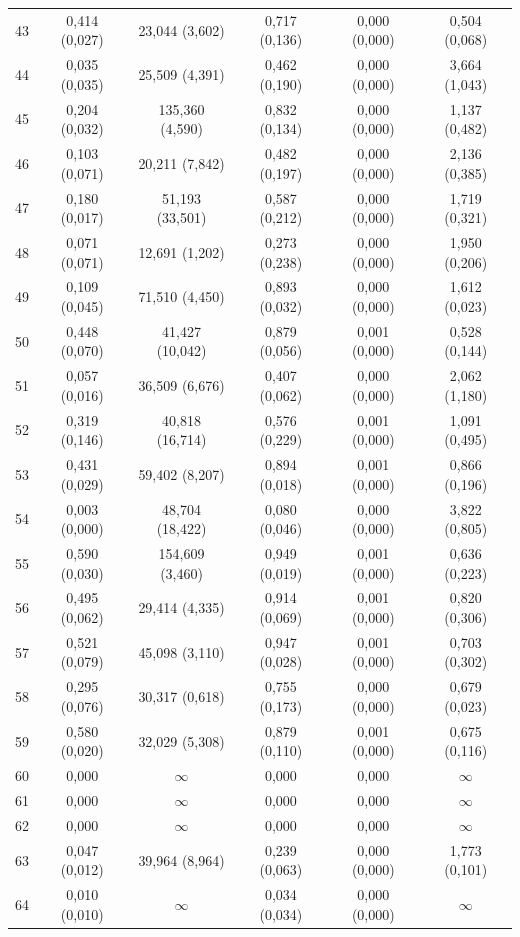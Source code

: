 \begin{tabular}{l c c c c c}
43 & 0,414 (0,027) & 23,044 (3,602) & 0,717 (0,136) & 0,000 (0,000) & 0,504 (0,068) \\
44 & 0,035 (0,035) & 25,509 (4,391) & 0,462 (0,190) & 0,000 (0,000) & 3,664 (1,043) \\
45 & 0,204 (0,032) & 135,360 (4,590) & 0,832 (0,134) & 0,000 (0,000) & 1,137 (0,482) \\
46 & 0,103 (0,071) & 20,211 (7,842) & 0,482 (0,197) & 0,000 (0,000) & 2,136 (0,385) \\
47 & 0,180 (0,017) & 51,193 (33,501) & 0,587 (0,212) & 0,000 (0,000) & 1,719 (0,321) \\
48 & 0,071 (0,071) & 12,691 (1,202) & 0,273 (0,238) & 0,000 (0,000) & 1,950 (0,206) \\
49 & 0,109 (0,045) & 71,510 (4,450) & 0,893 (0,032) & 0,000 (0,000) & 1,612 (0,023) \\
50 & 0,448 (0,070) & 41,427 (10,042) & 0,879 (0,056) & 0,001 (0,000) & 0,528 (0,144) \\
51 & 0,057 (0,016) & 36,509 (6,676) & 0,407 (0,062) & 0,000 (0,000) & 2,062 (1,180) \\
52 & 0,319 (0,146) & 40,818 (16,714) & 0,576 (0,229) & 0,001 (0,000) & 1,091 (0,495) \\
53 & 0,431 (0,029) & 59,402 (8,207) & 0,894 (0,018) & 0,001 (0,000) & 0,866 (0,196) \\
54 & 0,003 (0,000) & 48,704 (18,422) & 0,080 (0,046) & 0,000 (0,000) & 3,822 (0,805) \\
55 & 0,590 (0,030) & 154,609 (3,460) & 0,949 (0,019) & 0,001 (0,000) & 0,636 (0,223) \\
56 & 0,495 (0,062) & 29,414 (4,335) & 0,914 (0,069) & 0,001 (0,000) & 0,820 (0,306) \\
57 & 0,521 (0,079) & 45,098 (3,110) & 0,947 (0,028) & 0,001 (0,000) & 0,703 (0,302) \\
58 & 0,295 (0,076) & 30,317 (0,618) & 0,755 (0,173) & 0,000 (0,000) & 0,679 (0,023) \\
59 & 0,580 (0,020) & 32,029 (5,308) & 0,879 (0,110) & 0,001 (0,000) & 0,675 (0,116) \\
60 & 0,000 & $\infty$ & 0,000 & 0,000 & $\infty$ \\
61 & 0,000 & $\infty$ & 0,000 & 0,000 & $\infty$ \\
62 & 0,000 & $\infty$ & 0,000 & 0,000 & $\infty$ \\
63 & 0,047 (0,012) & 39,964 (8,964) & 0,239 (0,063) & 0,000 (0,000) & 1,773 (0,101) \\
64 & 0,010 (0,010) & $\infty$ & 0,034 (0,034) & 0,000 (0,000) & $\infty$ \\

\end{tabular}
